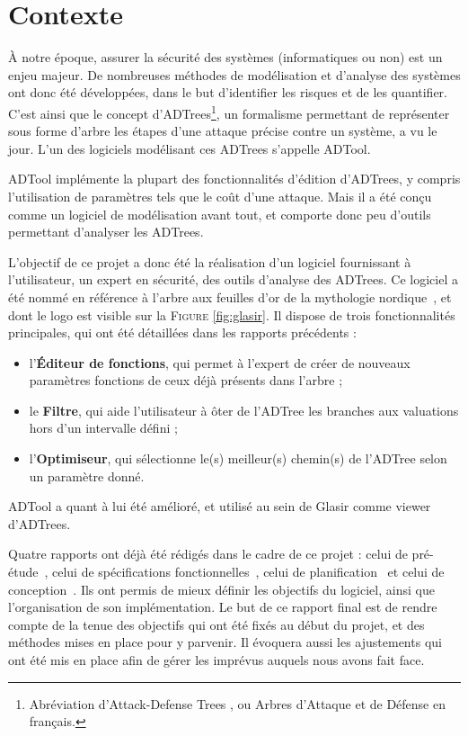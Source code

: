 \section{Contexte}
\label{Contexte}

    À notre époque, assurer la sécurité des systèmes (informatiques ou non) est un enjeu majeur. De nombreuses méthodes de modélisation et d'analyse des systèmes ont donc été développées, dans le but d'identifier les risques et de les quantifier. C'est ainsi que le concept d'ADTrees\footnote{Abréviation d'\og Attack-Defense Trees \fg{}, ou \og Arbres d'Attaque et de Défense\fg{} en français.}, un formalisme permettant de représenter sous forme d'arbre les étapes d'une attaque précise contre un système, a vu le jour. L'un des logiciels modélisant ces ADTrees s'appelle ADTool.

    ADTool implémente la plupart des fonctionnalités d'édition d'ADTrees, y compris l'utilisation de paramètres tels que le coût d'une attaque. Mais il a été conçu comme un logiciel de modélisation avant tout, et comporte donc peu d'outils permettant d'analyser les ADTrees.

    L'objectif de ce projet a donc été la réalisation d'un logiciel fournissant à l'utilisateur, un expert en sécurité, des outils d'analyse des ADTrees. Ce logiciel a été nommé \glasir{} en référence à l'arbre aux feuilles d'or de la mythologie nordique~\cite{vikingCulture}, et dont le logo est visible sur la \textsc{Figure} \ref{fig:glasir}. Il dispose de trois fonctionnalités principales, qui ont été détaillées dans les rapports précédents :
\begin{itemize}
    	\item l'{\bf Éditeur de fonctions}, qui permet à l'expert de créer de nouveaux paramètres fonctions de ceux déjà présents dans l'arbre ;
    	\item le {\bf Filtre}, qui aide l'utilisateur à ôter de l'ADTree les branches aux valuations hors d'un intervalle défini ;
    	\item l'{\bf Optimiseur}, qui sélectionne le(s) meilleur(s) chemin(s) de l'ADTree selon un paramètre donné.
\end{itemize} 
ADTool a quant à lui été amélioré, et utilisé au sein de Glasir comme viewer d'ADTrees. 

Quatre rapports ont déjà été rédigés dans le cadre de ce projet : celui de pré-étude~\cite{pre_etude}, celui de spécifications fonctionnelles~\cite{spec_fonc}, celui de planification~\cite{planif} et celui de conception~\cite{conception}. Ils ont permis de mieux définir les objectifs du logiciel, ainsi que l'organisation de son implémentation. Le but de ce rapport final est de rendre compte de la tenue des objectifs qui ont été fixés au début du projet, et des méthodes mises en place pour y parvenir. Il évoquera aussi les ajustements qui ont été mis en place afin de gérer les imprévus auquels nous avons fait face. 


